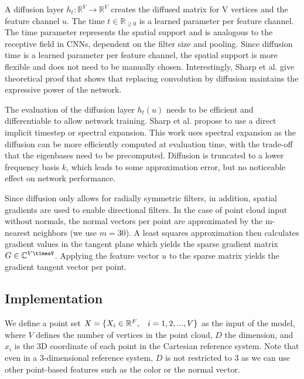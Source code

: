 \documentclass[class=article, crop=false]{standalone}
\begin{document}
A diffusion layer $h_t : \mathbb{R}^V \to \mathbb{R}^V$ creates the diffused matrix for V vertices and the feature channel $u$. The time $t \in \mathbb{R}_{\geq 0}$ is a learned parameter per feature channel. The time parameter represents the spatial support and is analogous to the receptive field in CNNs, dependent on the filter size and pooling. Since diffusion time is a learned parameter per feature channel, the spatial support is more flexible and does not need to be manually chosen. Interestingly, Sharp et al. give theoretical proof that shows that replacing convolution by diffusion maintains the expressive power of the network.

The evaluation of the diffusion layer $h_t(u)$ needs to be efficient and differentiable to allow network training. Sharp et al. propose to use a direct implicit timestep or spectral expansion. This work uses spectral expansion as the diffusion can be more efficiently computed at evaluation time, with the trade-off that the eigenbases need to be precomputed. Diffusion is truncated to a lower frequency basis $k$, which leads to some approximation error, but no noticeable effect on network performance.

Since diffusion only allows for radially symmetric filters, in addition, spatial gradients are used to enable directional filters. In the case of point cloud input without normals, the normal vectors per point are approximated by the m-nearest neighbors (we use $m = 30$). A least squares approximation then calculates gradient values in the tangent plane which yields the sparse gradient matrix $G \in \mathbb{C}^{V\timesV}$. Applying the feature vector $u$ to the sparse matrix yields the gradient tangent vector per point.




\subsection{Implementation}
We define a point set \begin{math}X=\{X_i \in \mathbb{R}^F,\hspace{0.3cm}i = 1,2,...,V\}\end{math} as the input of the model, where $V$ defines the number of vertices in the point cloud, $D$ the dimension, and $x_i$ is the 3D coordinate of each point in the Cartesian reference system. Note that even in a 3-dimensional reference system, $D$ is not restricted to 3 as we can use other point-based features such as the color or the normal vector.
\end{document}
